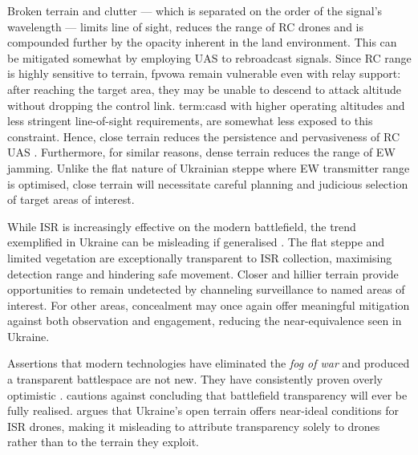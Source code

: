 Broken terrain and clutter --- which is separated on the order of the signal's wavelength --- limits line of sight, reduces the range of RC drones \parencite[31,53]{neron_bancel_2024_05_27} and is compounded further by the opacity inherent in the land environment. This can be mitigated somewhat by employing UAS to rebroadcast signals. Since RC range is highly sensitive to terrain, \gls{fpvowa} remain vulnerable even with relay support: after reaching the target area, they may be unable to descend to attack altitude without dropping the control link. \gls{term:casd} with higher operating altitudes and less stringent line-of-sight requirements, are somewhat less exposed to this constraint. Hence, close terrain reduces the persistence and pervasiveness of RC UAS \parencite[1:00--1:57]{civdiv_4}. Furthermore, for similar reasons, dense terrain reduces the range of EW jamming. Unlike the flat nature of Ukrainian steppe where EW transmitter range is optimised, close terrain will necessitate careful planning and judicious selection of target areas of interest. 

While ISR is increasingly effective on the modern battlefield, the trend exemplified in Ukraine can be misleading if generalised \parencite{bob_tollast_participant_12}. The flat steppe and limited vegetation are exceptionally transparent to ISR collection, maximising detection range and hindering safe movement. Closer and hillier terrain provide opportunities to remain undetected by channeling surveillance to named areas of interest. For other areas, concealment may once again offer meaningful mitigation against both observation and engagement, reducing the near-equivalence seen in Ukraine.





Assertions that modern technologies have eliminated the \textit{fog of war} and produced a transparent battlespace are not new. They have consistently proven overly optimistic \parencite[49]{ALACH_2008}. \textcite{DAVIS_e_2025} cautions against concluding that battlefield transparency will ever be fully realised. \textcite{bob_tollast_participant_12} argues that Ukraine’s open terrain offers near-ideal conditions for ISR drones, making it misleading to attribute transparency solely to drones rather than to the terrain they exploit.

